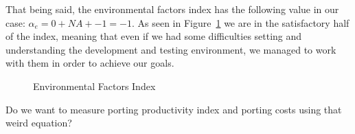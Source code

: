 That being said, the environmental factors index has the following value in our
case: $\alpha_e = 0 + NA + -1 = -1$. As seen in Figure~\ref{fig:EFI} we are in the
satisfactory half of the index, meaning that even if we had some difficulties
setting and understanding the development and testing environment, we managed
to work with them in order to achieve our goals.

\begin{figure}

    \caption{Environmental Factors Index}
    \label{fig:EFI}
\end{figure}

Do we want to measure porting productivity index and porting costs using that
weird equation?
